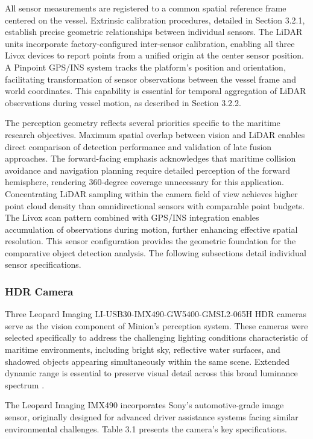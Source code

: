 \documentclass{erauthesis}
\begin{document}
All sensor measurements are registered to a common spatial reference frame centered on the vessel.
Extrinsic calibration procedures, detailed in Section 3.2.1, establish precise geometric relationships between individual sensors.
The \ac{LiDAR} units incorporate factory-configured inter-sensor calibration, enabling all three Livox devices to report points from a unified origin at the center sensor position.
A Pinpoint \ac{GPS}/\ac{INS} system tracks the platform's position and orientation, facilitating transformation of sensor observations between the vessel frame and world coordinates.
This capability is essential for temporal aggregation of \ac{LiDAR} observations during vessel motion, as described in Section 3.2.2.

The perception geometry reflects several priorities specific to the maritime research objectives.
Maximum spatial overlap between vision and \ac{LiDAR} enables direct comparison of detection performance and validation of late fusion approaches.
The forward-facing emphasis acknowledges that maritime collision avoidance and navigation planning require detailed perception of the forward hemisphere, rendering 360-degree coverage unnecessary for this application.
Concentrating \ac{LiDAR} sampling within the camera field of view achieves higher point cloud density than omnidirectional sensors with comparable point budgets.
The Livox scan pattern combined with \ac{GPS}/\ac{INS} integration enables accumulation of observations during motion, further enhancing effective spatial resolution.
This sensor configuration provides the geometric foundation for the comparative object detection analysis.
The following subsections detail individual sensor specifications.

            \subsubsection{HDR Camera}

Three Leopard Imaging LI-USB30-IMX490-GW5400-GMSL2-065H \ac{HDR} cameras serve as the vision component of Minion's perception system.
These cameras were selected specifically to address the challenging lighting conditions characteristic of maritime environments, including bright sky, reflective water surfaces, and shadowed objects appearing simultaneously within the same scene.
Extended dynamic range is essential to preserve visual detail across this broad luminance spectrum \cite{thompson2023}.

The Leopard Imaging IMX490 incorporates Sony's automotive-grade image sensor, originally designed for advanced driver assistance systems facing similar environmental challenges.
Table 3.1 presents the camera's key specifications.
\end{document}

